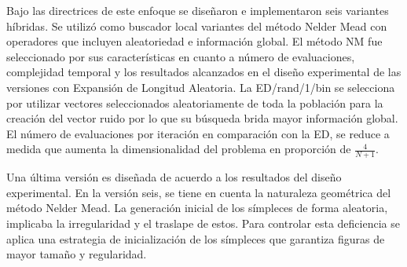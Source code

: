 Bajo las directrices de este enfoque se diseñaron e implementaron seis variantes híbridas. Se utilizó como buscador local variantes del método Nelder Mead con operadores que incluyen aleatoriedad e información global. El método NM fue seleccionado por sus características en cuanto a número de evaluaciones, complejidad temporal y los resultados alcanzados en el diseño experimental de las versiones con Expansión de Longitud Aleatoria. La ED/rand/1/bin se selecciona por utilizar vectores seleccionados aleatoriamente de toda la población para la creación del vector ruido por lo que su búsqueda brida mayor información global. El número de evaluaciones por iteración en comparación con la ED, se reduce a medida que aumenta la dimensionalidad del problema en proporción de $\frac{4}{N+1}$.

Una última versión es diseñada de acuerdo a los resultados del diseño experimental. En la versión seis, se tiene en cuenta la naturaleza geométrica del método Nelder Mead. La generación inicial de los símpleces de forma aleatoria, implicaba la irregularidad y el traslape de estos. Para controlar esta deficiencia se aplica una estrategia de inicialización de los símpleces que garantiza figuras de mayor tamaño y regularidad.  
